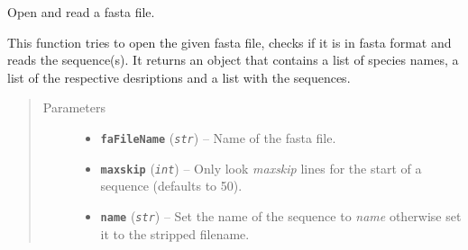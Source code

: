 \documentclass[letterpaper,10pt,english]{sphinxmanual}
\begin{document}
\begin{fulllineitems}
\label{fasta:libPoMo.fasta.open_seq}
Open and read a fasta file.

This function tries to open the given fasta file, checks if it is
in fasta format and reads the sequence(s).  It returns an
{\hyperref[fasta:libPoMo.fasta.FaSeq]{}} object that contains a list of species names, a
list of the respective desriptions and a list with the sequences.
\begin{quote}\begin{description}
\item[{Parameters}] \leavevmode\begin{itemize}
\item {} 
\textbf{\texttt{faFileName}} (\emph{\texttt{str}}) -- Name of the fasta file.

\item {} 
\textbf{\texttt{maxskip}} (\emph{\texttt{int}}) -- Only look \emph{maxskip} lines for the start of a sequence
(defaults to 50).

\item {} 
\textbf{\texttt{name}} (\emph{\texttt{str}}) -- Set the name of the sequence to \emph{name} otherwise
set it to the stripped filename.

\end{itemize}

\end{description}\end{quote}

\end{fulllineitems}

\end{document}
